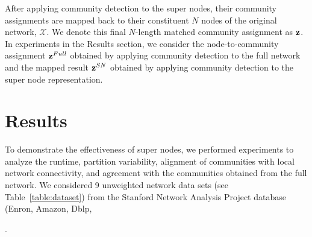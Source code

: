 After applying community detection to the super nodes, their community assignments are mapped back to their constituent $N$ nodes of the original network, ${\mathcal X}$. We denote this final $N$-length matched community assignment as ${\bf z}$. In experiments in the Results section, we consider the node-to-community assignment ${\bf z}^{Full}$ obtained by applying community detection to the full network and the mapped result ${\bf z}^{SN}$ obtained by applying community detection to the super node representation.

\section{Results}
To demonstrate the effectiveness of super nodes, we performed experiments to analyze the runtime, partition variability, alignment of communities with local network connectivity, and agreement with the communities obtained from the full network. We considered 9 unweighted network data sets (see Table~\ref{table:dataset})  from the Stanford Network Analysis Project database\cite{snapdata}
(Enron, Amazon, Dblp, 
\begin{table}.   %
\begin{center}
\end{center}
\caption{{\bf Network data characteristics.} \label{table:dataset}}
\end{table}
